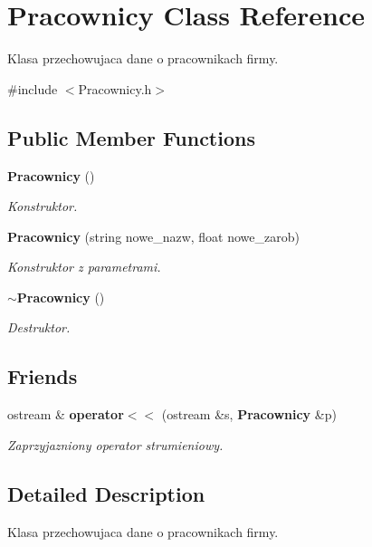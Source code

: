 \section{Pracownicy Class Reference}
\label{class_pracownicy}


Klasa przechowujaca dane o pracownikach firmy.  




{\ttfamily \#include $<$Pracownicy.\+h$>$}

\subsection*{Public Member Functions}
\begin{DoxyCompactItemize}
\item 
\textbf{ Pracownicy} ()
\begin{DoxyCompactList}\small\item\em Konstruktor. \end{DoxyCompactList}\item 
\textbf{ Pracownicy} (string nowe\+\_\+nazw, float nowe\+\_\+zarob)
\begin{DoxyCompactList}\small\item\em Konstruktor z parametrami. \end{DoxyCompactList}\item 
\textbf{ $\sim$\+Pracownicy} ()
\begin{DoxyCompactList}\small\item\em Destruktor. \end{DoxyCompactList}\end{DoxyCompactItemize}
\subsection*{Friends}
\begin{DoxyCompactItemize}
\item 
ostream \& \textbf{ operator$<$$<$} (ostream \&s, \textbf{ Pracownicy} \&p)
\begin{DoxyCompactList}\small\item\em Zaprzyjazniony operator strumieniowy. \end{DoxyCompactList}\end{DoxyCompactItemize}


\subsection{Detailed Description}
Klasa przechowujaca dane o pracownikach firmy. 

